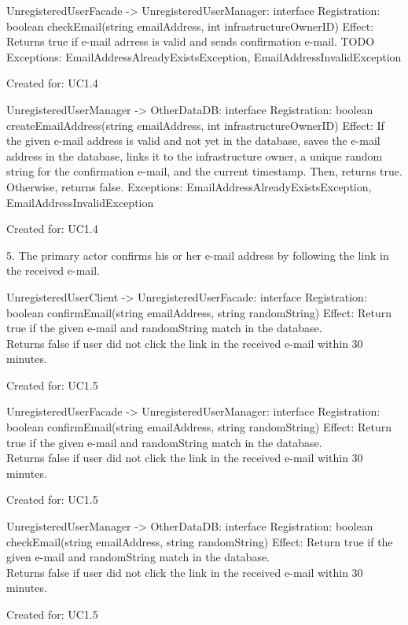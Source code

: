             UnregisteredUserFacade -> UnregisteredUserManager: interface Registration: boolean checkEmail(string emailAddress, int infrastructureOwnerID)
                Effect: Returns true if e-mail adrress is valid and sends confirmation e-mail. TODO
                Exceptions: EmailAddressAlreadyExistsException, EmailAddressInvalidException
                \item Created for: UC1.4

            UnregisteredUserManager -> OtherDataDB: interface Registration: boolean createEmailAddress(string emailAddress, int infrastructureOwnerID)
                Effect: If the given e-mail address is valid and not yet in the database, saves the e-mail address
                        in the database, links it to the infrastructure owner, a unique random string for the confirmation e-mail,
                        and the current timestamp. Then, returns true. \\
                        Otherwise, returns false.
                Exceptions: EmailAddressAlreadyExistsException, EmailAddressInvalidException
                \item Created for: UC1.4

        5. The primary actor confirms his or her e-mail address by following the link in the received e-mail.

            UnregisteredUserClient -> UnregisteredUserFacade: interface Registration: boolean confirmEmail(string emailAddress, string randomString)
                Effect: Return true if the given e-mail and randomString match in the database. \\
                        Returns false if user did not click the link in the received e-mail within 30 minutes.
                \item Created for: UC1.5

            UnregisteredUserFacade -> UnregisteredUserManager: interface Registration: boolean confirmEmail(string emailAddress, string randomString)
                Effect: Return true if the given e-mail and randomString match in the database. \\
                        Returns false if user did not click the link in the received e-mail within 30 minutes.
                \item Created for: UC1.5

            UnregisteredUserManager -> OtherDataDB: interface Registration: boolean checkEmail(string emailAddress, string randomString)
                Effect: Return true if the given e-mail and randomString match in the database. \\
                        Returns false if user did not click the link in the received e-mail within 30 minutes.
                \item Created for: UC1.5

